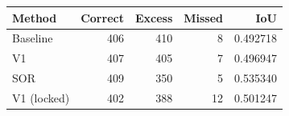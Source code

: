 \begin{tabular}{lrrrr}
\toprule
Method & Correct & Excess & Missed & IoU \\
\midrule
Baseline & 406 & 410 & 8 & 0.492718 \\
V1 & 407 & 405 & 7 & 0.496947 \\
SOR & 409 & 350 & 5 & 0.535340 \\
V1 (locked) & 402 & 388 & 12 & 0.501247 \\
\bottomrule
\end{tabular}
